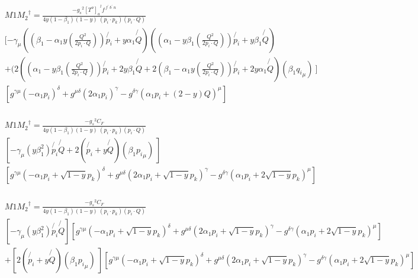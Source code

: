 \begin{equation}
\begin{split}
&M1{M_2}^{\dagger}=\frac{-{g_s}^2 {[T^{o}]_a}^{l} f^{\:f^{\prime}\: b^{\prime}\:n}}{4 y(1-\beta_1) (1-y)\:(p_i \cdot p_k)(p_i \cdot Q)}\\
&[-\gamma_{\mu}((\beta_1 -\alpha_1 y(\frac{Q^2}{2p_i \cdot Q}))\not{p_i} + y\alpha_1\not{Q})((\alpha_1 -y\beta_1(\frac{Q^2}{2p_i \cdot Q})) \not{p_i} + y\beta_1\not{Q})\\
&+(2((\alpha_1 -y\beta_1(\frac{Q^2}{2p_i \cdot Q})) \not{p_i} + 2y\beta_1\not{Q}+2(\beta_1 -\alpha_1 y(\frac{Q^2}{2p_i \cdot Q}))\not{p_i} + 2y\alpha_1\not{Q})(\beta_1{q_i}_{\mu})\:]\\
&[ g^{{{\gamma}}{{\mu}}}(-\alpha_1p_i)^{\delta}+g^{{{\mu}}{{\delta}}}(2\alpha_1p_i )^{{\gamma}}-g^{\delta{{\gamma}}}(\alpha_1p_i+(2-y)Q)^{{\mu}}]\\
\end{split}
\end{equation}

\begin{equation}
\begin{split}
&M1{M_2}^{\dagger}=\frac{-{g_s}^2 C_F}{4 y(1-\beta_1) (1-y)\:(p_i \cdot p_k)(p_i \cdot Q)}\\
&[-\gamma_{\mu}(y\beta_1^2)\not{p_i}\not{Q}+2(\not{p_i}+y\not{Q})(\beta_1{p_i}_{\mu})\:]\\
&[ g^{{{\gamma}}{{\mu}}}(-\alpha_1p_i+\sqrt{1-y} p_k)^{\delta}+g^{{{\mu}}{{\delta}}}(2\alpha_1p_i+ \sqrt{1-y} p_k)^{{\gamma}}-g^{\delta{{\gamma}}}(\alpha_1p_i+2\sqrt{1-y} p_k)^{{\mu}}]\\
\end{split}
\end{equation}

\begin{equation}
\begin{split}
&M1{M_2}^{\dagger}=\frac{-{g_s}^2 C_F}{4 y(1-\beta_1) (1-y)\:(p_i \cdot p_k)(p_i \cdot Q)}\\
&[-\gamma_{\mu}(y\beta_1^2)\not{p_i}\not{Q}][ g^{{{\gamma}}{{\mu}}}(-\alpha_1p_i+\sqrt{1-y} p_k)^{\delta}+g^{{{\mu}}{{\delta}}}(2\alpha_1p_i+ \sqrt{1-y} p_k)^{{\gamma}}-g^{\delta{{\gamma}}}(\alpha_1p_i+2\sqrt{1-y} p_k)^{{\mu}}]\\
&+[2(\not{p_i}+y\not{Q})(\beta_1{p_i}_{\mu})\:][ g^{{{\gamma}}{{\mu}}}(-\alpha_1p_i+\sqrt{1-y} p_k)^{\delta}+g^{{{\mu}}{{\delta}}}(2\alpha_1p_i+ \sqrt{1-y} p_k)^{{\gamma}}-g^{\delta{{\gamma}}}(\alpha_1p_i+2\sqrt{1-y} p_k)^{{\mu}}]\\
\end{split}
\end{equation}

